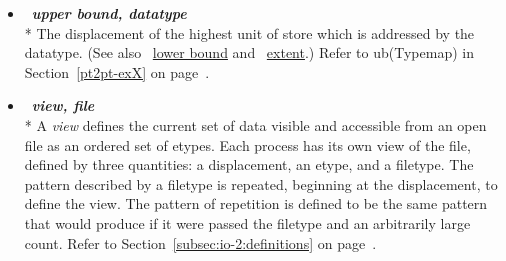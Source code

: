 \begin{itemize}
\label{glossary:upper_bound_datatype}
\item  ~\hypertarget{glossary:upper_bound_datatype}{\emph{\textbf{upper bound, datatype}}} \\*
The displacement of the highest unit of store which is addressed by the datatype. 
(See also ~\hyperlink{glossary:lower_bound}{lower bound} and ~\hyperlink{glossary:extent}{extent}.)
Refer to ub(Typemap) in Section~\ref{pt2pt-exX} on page~\pageref{pt2pt-exX}.

\label{glossary:view_file}
\item  ~\hypertarget{glossary:view_file}{\emph{\textbf{view, file}}} \\*
A {\it view} defines the current set of data visible
and accessible from an open file as an ordered set of etypes.
Each process has its own view of the file,
defined by three quantities:
a displacement, an etype, and a filetype.
The pattern described by a filetype is repeated,
beginning at the displacement, to define the view.
The pattern of repetition is defined to be the same pattern
that  would produce if it were passed
the filetype and an arbitrarily large count.
Refer to Section~\ref{subsec:io-2:definitions} on page~\pageref{subsec:io-2:definitions}.


\end{itemize}

